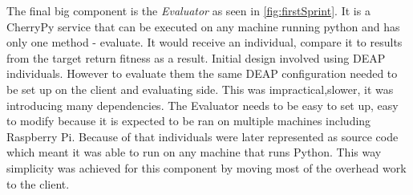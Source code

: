 The final big component is the \textit{Evaluator} as seen in \ref{fig:firstSprint}. It is a CherryPy service that can be executed on any machine running python and
 has only one method - evaluate. It would receive an individual, compare it to results from the target return fitness as a result. Initial design involved using DEAP individuals.
However to evaluate them the same DEAP configuration needed to be set up on the client and evaluating side.
This was impractical,slower, it was introducing many dependencies. The Evaluator needs
to be easy to set up, easy to modify because it is expected to be ran on multiple machines including Raspberry Pi.
Because of that individuals were later represented as source code which meant it was able to run on any machine
that runs Python. This way simplicity was achieved for this component by moving most of the overhead work to the client.
